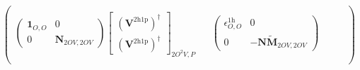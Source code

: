 \begin{align}
\begin{pmatrix}
& &  &  & & \\
\begin{pmatrix}
\bm{1}_{O,O} & 0 \\
0 & \bm{N}_{2OV,2OV}
\end{pmatrix}
\begin{bmatrix}
\left( \bm{V}^{2\mathrm{h1p}} \right)^{\dagger} \\ \left( \bm{V}^{2\mathrm{h1p}}\right)^{\dagger}\end{bmatrix}_{2O^2V,P} &  &\begin{pmatrix}
    \epsilon^{1\mathrm{h}}_{O,O} & 0 \\
    0 & -\mathbf{N}\tilde{\bm{M}}_{2OV,2OV}
\end{pmatrix} \\
\end{pmatrix}
\end{align}
